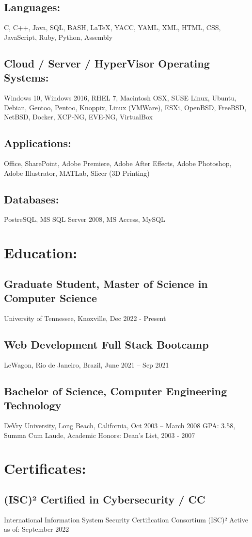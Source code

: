 \documentclass[letter,10pt]{article}
\begin{document}
\subsection*{Languages:}
\label{sec:org57e5be3}
C, C++, Java, SQL, BASH, \LaTeX{}, YACC, YAML, XML, HTML, CSS, JavaScript, Ruby, Python, Assembly
\subsection*{Cloud / Server / HyperVisor Operating Systems:}
\label{sec:orgefe0200}
Windows 10, Windows 2016, RHEL 7, Macintosh OSX, SUSE Linux, Ubuntu, Debian, Gentoo, Pentoo, Knoppix, Linux  (VMWare), ESXi, OpenBSD, FreeBSD, NetBSD, Docker, XCP-NG, EVE-NG, VirtualBox
\subsection*{Applications:}
\label{sec:org5daaa3c}
Office, SharePoint, Adobe Premiere, Adobe After Effects, Adobe Photoshop, Adobe Illustrator, MATLab, Slicer (3D Printing)
\subsection*{Databases:}
\label{sec:orge1b05c7}
PostreSQL, MS SQL Server 2008, MS Access, MySQL
\section*{Education:}
\label{sec:orgcdac1e3}
\subsection*{Graduate Student, Master of Science in Computer Science}
\label{sec:orgf59325a}
University of Tennessee, Knoxville, Dec 2022 - Present
\subsection*{Web Development Full Stack Bootcamp}
\label{sec:org4bd3565}
LeWagon, Rio de Janeiro, Brazil, June 2021 – Sep 2021
\subsection*{Bachelor of Science, Computer Engineering Technology}
\label{sec:org6f4a0df}
DeVry University, Long Beach, California, Oct 2003 – March 2008
GPA: 3.58, Summa Cum Laude, Academic Honors: Dean’s List, 2003 - 2007

\section*{Certificates:}
\label{sec:org0931016}
\subsection*{(ISC)² Certified in Cybersecurity / CC}
\label{sec:org2bc79a2}
International Information System Security Certification Consortium (ISC)²
Active as of: September 2022
\end{document}
